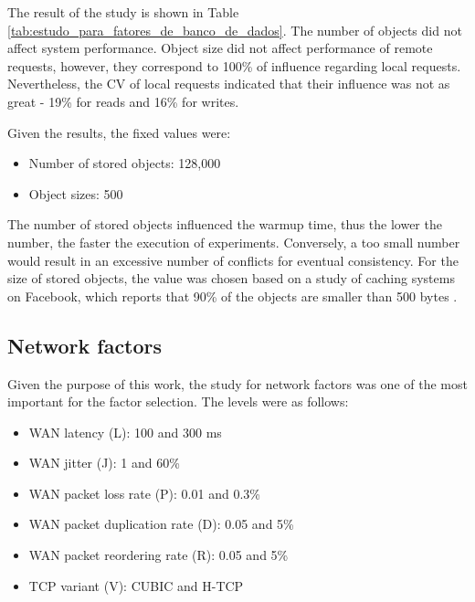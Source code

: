\documentclass[man,floatsintext,12pt]{apa6}
\begin{document}
The result of the study is shown in Table
\ref{tab:estudo_para_fatores_de_banco_de_dados}. The number of objects did not
affect system performance. Object size did not affect performance of remote
requests, however, they correspond to 100\% of influence regarding local
requests. Nevertheless, the CV of local requests indicated that their influence
was not as great - 19\% for reads and 16\% for writes.

Given the results, the fixed values were:

\begin{itemize}

\item Number of stored objects: 128,000

\item Object sizes: 500

\end{itemize}

The number of stored objects influenced the warmup time, thus the lower the
number, the faster the execution of experiments. Conversely, a too small number
would result in an excessive number of conflicts for eventual consistency. For
the size of stored objects, the value was chosen based on a study of caching
systems on Facebook, which reports that 90\% of the objects are smaller than
500 bytes \parencite{Atikoglu2012}.

\subsection{Network factors}

Given the purpose of this work, the study for network factors was one of the
most important for the factor selection. The levels were as follows:

\begin{itemize}

\item WAN latency (L): 100 and 300 ms

\item WAN jitter (J): 1 and 60\%

\item WAN packet loss rate (P): 0.01 and 0.3\%

\item WAN packet duplication rate (D): 0.05 and 5\%

\item WAN packet reordering rate (R): 0.05 and 5\%

\item TCP variant (V): CUBIC and H-TCP

\end{itemize}
\end{document}
